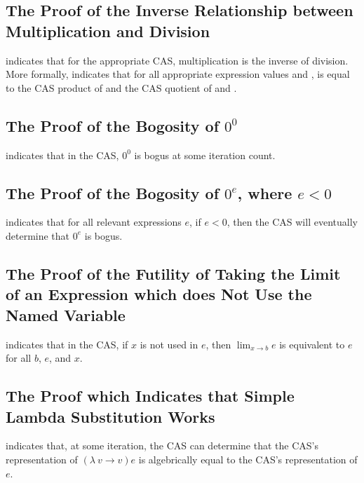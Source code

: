 \documentclass{report}
\begin{document}
\subsection{The Proof of the Inverse Relationship between Multiplication and Division}
 indicates that for the appropriate CAS, multiplication is the inverse of division.  More formally,   indicates that for all appropriate expression values  and ,  is equal to the  CAS product of  and the  CAS quotient of  and .

\subsection{The Proof of the Bogosity of \(0^0\)}
  indicates that in the  CAS, \(0^0\) is bogus at some iteration count.

\subsection{The Proof of the Bogosity of \(0^e\), where \(e < 0\)}
  indicates that for all relevant expressions \(e\), if \(e < 0\), then the CAS will eventually determine that \(0^e\) is bogus.

\subsection{The Proof of the Futility of Taking the Limit of an Expression which does Not Use the Named Variable}
  indicates that in the  CAS, if \(x\) is not used in \(e\), then \(\lim_{x \rightarrow b} e\) is equivalent to \(e\) for all \(b\), \(e\), and \(x\).

\subsection{The Proof which Indicates that Simple Lambda Substitution Works}
  indicates that, at some iteration, the  CAS can determine that the  CAS's representation of \(\left(\lambda\ v \rightarrow v\right) e\) is algebrically equal to the  CAS's representation of \(e\).
\end{document}
